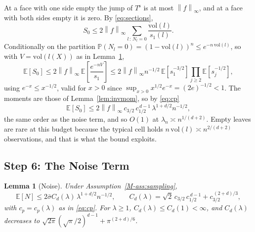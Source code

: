 \documentclass[12pt,a4paper]{article}
\numberwithin{equation}{section}
\theoremstyle{plain}
\newtheorem{lemma}{Lemma}
\theoremstyle{definition}
\newcommand{\norm}[1]{\left\| #1 \right\|}
\newcommand{\E}{\mathbb{E}}
\newcommand{\Prob}{\mathbb{P}}
\begin{document}
	At a face with one side empty the jump of $T^{\mathrm{s}}$ is at most
	$\norm{f}_\infty$, and at a face with both sides empty it is zero. By
	\eqref{eq:sections},
	\begin{equation}
		S_0 \leq 2\norm{f}_\infty
		\sum_{l\,:\,N_l = 0} \frac{\mathrm{vol}(l)}{s_1(l)} .
	\end{equation}
	Conditionally on the partition $\Prob(N_l = 0) = (1-\mathrm{vol}(l))^n
	\leq e^{-n\,\mathrm{vol}(l)}$, so with $V = \mathrm{vol}(l(X))$ as in
	Lemma~\ref{lem:noise},
	\begin{equation}
		\E[S_0] \leq 2\norm{f}_\infty\,
		\E\!\left[\frac{e^{-nV}}{s_1}\right]
		\leq 2\norm{f}_\infty n^{-1/2}\,
		\E\!\left[s_1^{-3/2}\right]\prod_{j \geq 2}\E\!\left[s_j^{-1/2}\right],
	\end{equation}
	using $e^{-x} \leq x^{-1/2}$, valid for $x > 0$ since
	$\sup_{x>0} x^{1/2}e^{-x} = (2e)^{-1/2} < 1$. The moments are those of
	Lemma~\ref{lem:invmom}, so by \eqref{eq:cp}
	\begin{equation}
		\E[S_0] \leq 2\norm{f}_\infty\, c_{3/2}\,c_{1/2}^{\,d-1}\,
		\lambda^{1+d/2} n^{-1/2},
	\end{equation}
	the same order as the noise term, and so $O(1)$ at
	$\lambda_n \asymp n^{1/(d+2)}$. Empty leaves are rare at this budget because
	the typical cell holds $n\,\mathrm{vol}(l) \asymp n^{2/(d+2)}$ observations,
	and that is what the bound exploits.

	\subsection{Step 6: The Noise Term}

	\begin{lemma}[Noise]
		\label{lem:noise}
		Under Assumption~\ref{M-ass:sampling},
		\begin{equation}
			\E[N] \leq 2\bar{\sigma} C_d(\lambda)\, \lambda^{1 + d/2} n^{-1/2},
			\qquad
			C_d(\lambda) = \sqrt{2}\,c_{3/2}\,c_{1/2}^{\,d-1}
			+ c_{3/2}^{\,(2+d)/3},
		\end{equation}
		with $c_p = c_p(\lambda)$ as in \eqref{eq:cp}. For $\lambda \geq 1$,
		$C_d(\lambda) \leq C_d(1) < \infty$, and $C_d(\lambda)$ decreases to
		$\sqrt{2\pi}(\sqrt{\pi}/2)^{d-1} + \pi^{(2+d)/6}$.
	\end{lemma}
\end{document}
